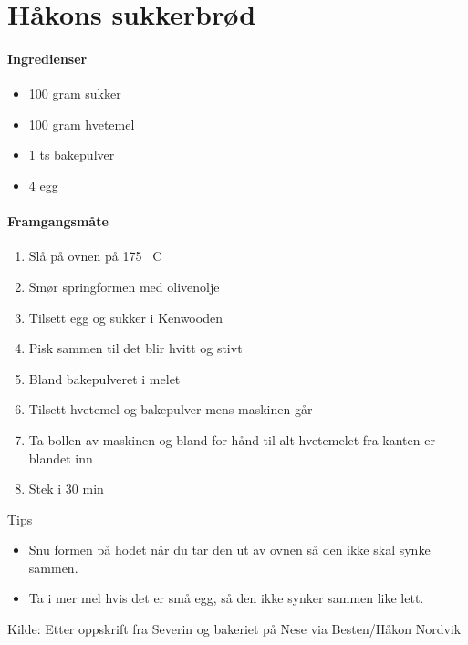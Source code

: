 \section{﻿Håkons sukkerbrød}
\label{sukkerbrod}

\paragraph{Ingredienser}
\begin{itemize}[noitemsep]
	\item 100 gram sukker
	\item 100 gram hvetemel
	\item 1 ts bakepulver
	\item 4 egg
\end{itemize}

\paragraph{Framgangsmåte}
\begin{enumerate}[noitemsep]
	\item Slå på ovnen på 175 \degree~C
	\item Smør springformen med olivenolje
	\item Tilsett egg og sukker i Kenwooden
	\item Pisk sammen til det blir hvitt og stivt
	\item Bland bakepulveret i melet
	\item Tilsett hvetemel og bakepulver mens maskinen går
	\item Ta bollen av maskinen og bland for hånd til alt hvetemelet fra kanten er blandet inn
	\item Stek i 30 min
\end{enumerate}


Tips
\begin{itemize}[noitemsep]
	\item Snu formen på hodet når du tar den ut av ovnen så den ikke skal synke sammen.
	\item Ta i mer mel hvis det er små egg, så den ikke synker sammen like lett.\\
\end{itemize}

Kilde: Etter oppskrift fra Severin og bakeriet på Nese via Besten/Håkon Nordvik
